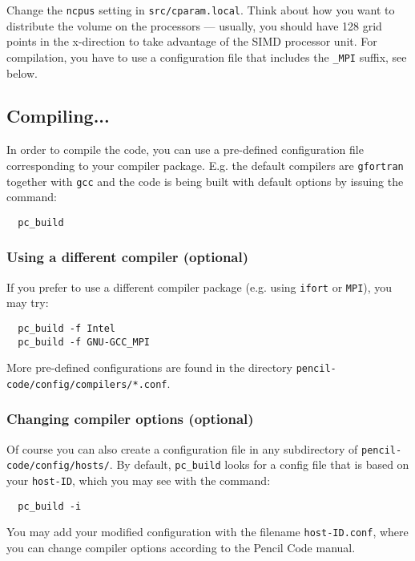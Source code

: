 \documentclass[a4paper,12pt]{article}
\begin{document}
Change the \verb|ncpus| setting in \verb|src/cparam.local|.
Think about how you want to distribute the volume on the processors --- usually, you should have 128 grid points in the x-direction to take advantage of the SIMD processor unit.
For compilation, you have to use a configuration file that includes the \verb|_MPI| suffix, see below.

\subsection{Compiling...}

In order to compile the code, you can use a pre-defined configuration file corresponding to your compiler package.
E.g. the default compilers are \verb|gfortran| together with \verb|gcc| and the code is being built with default options by issuing the command:

\begin{verbatim}
  pc_build
\end{verbatim}

\subsubsection{Using a different compiler (optional)}

If you prefer to use a different compiler package (e.g. using \verb|ifort| or \verb|MPI|), you may try:

\begin{verbatim}
  pc_build -f Intel
  pc_build -f GNU-GCC_MPI
\end{verbatim}

More pre-defined configurations are found in the directory \verb|pencil-code/config/compilers/*.conf|.

\subsubsection{Changing compiler options (optional)}

Of course you can also create a configuration file in any subdirectory of \verb|pencil-code/config/hosts/|.
By default, \verb|pc_build| looks for a config file that is based on your \verb|host-ID|, which you may see with the command:
\begin{verbatim}
  pc_build -i
\end{verbatim}
You may add your modified configuration with the filename \verb|host-ID.conf|, where you can change compiler options according to the Pencil Code manual.
\end{document}
